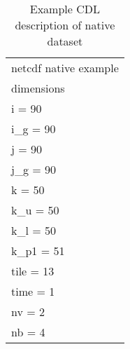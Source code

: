 \begin{longtable}{|p{\textwidth}|}
\caption{Example CDL description of native dataset}
\label{tab:cdl-native} \\
\hline \endhead
\hline \endfoot
netcdf native example\\
dimensions\\
\hline
\rowcolor{YellowGreen}  i = 90\\
\rowcolor{YellowGreen}  i\_g = 90\\
\rowcolor{YellowGreen}  j = 90\\
\rowcolor{YellowGreen}  j\_g = 90\\
\rowcolor{YellowGreen}  k = 50\\
\rowcolor{YellowGreen}  k\_u = 50\\
\rowcolor{YellowGreen}  k\_l = 50\\
\rowcolor{YellowGreen}  k\_p1 = 51\\
\rowcolor{YellowGreen}  tile = 13\\
\rowcolor{YellowGreen}  time = 1\\
\rowcolor{YellowGreen}  nv = 2\\
\rowcolor{YellowGreen}  nb = 4\\
\hline


\end{longtable}
